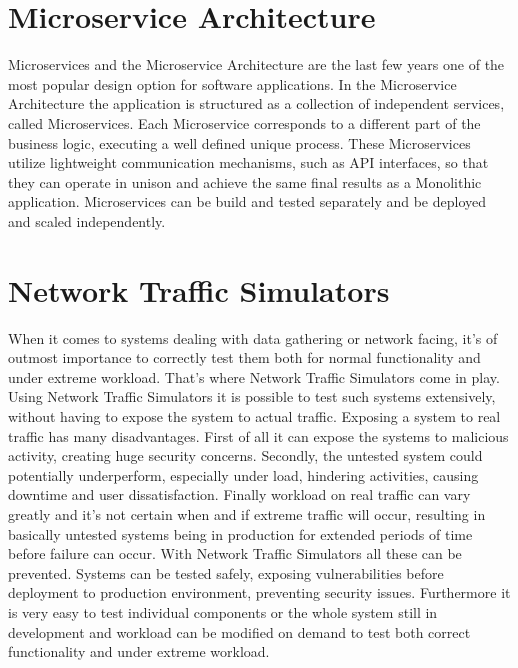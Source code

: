 \documentclass{article}
\begin{document}
\section{Microservice Architecture}

Microservices and the Microservice Architecture are the last few years one of the most popular design option for software applications. In the Microservice Architecture the application is structured as a collection of independent services, called Microservices. Each Microservice corresponds to a different part of the business logic, executing a well defined unique process\cite{monovsmicro}\cite{microservicesdef}. These Microservices utilize lightweight communication mechanisms, such as API interfaces, so that they can operate in unison and achieve the same final results as a Monolithic application. Microservices can be build and tested separately and be deployed and scaled independently. 

\section{Network Traffic Simulators}

When it comes to systems dealing with data gathering or network facing, it's of outmost importance to correctly test them both for normal functionality and under extreme workload. That's where Network Traffic Simulators come in play. Using Network Traffic Simulators it is possible to test such systems extensively, without having to expose the system to actual traffic. Exposing a system to real traffic has many disadvantages. First of all it can expose the systems to malicious activity, creating huge security concerns. Secondly, the untested system could potentially underperform, especially under load, hindering activities, causing downtime and user dissatisfaction. Finally workload on real traffic can vary greatly and it's not certain when and if extreme traffic will occur, resulting in basically untested systems being in production for extended periods of time before failure can occur. With Network Traffic Simulators all these can be prevented. Systems can be tested safely, exposing vulnerabilities before deployment to production environment, preventing security issues. Furthermore it is very easy to test individual components or the whole system still in development and workload can be modified on demand to test both correct functionality and under extreme workload.


\end{document}
